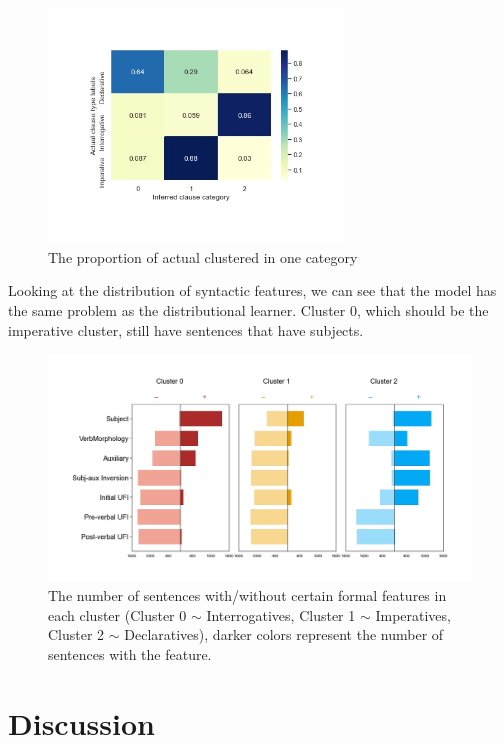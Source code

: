 \begin{figure}[H]
    \centering
    \includegraphics[width=0.7\textwidth]{figures/noisy100-heatrev.jpg}
    \caption{The proportion of actual \diis{} clustered in one category}
    \label{fig:noisy100-heatrev}
\end{figure}

Looking at the distribution of syntactic features, we can see that the model has the same problem as the distributional learner. Cluster $0$, which should be the imperative cluster, still have sentences that have subjects. 

\begin{figure}[H]
    \centering
    \includegraphics[width=1\textwidth]{figures/noisy100-syncluster.jpg}
    \caption{The number of sentences with/without certain formal features in each cluster (Cluster 0 $\sim$ Interrogatives, Cluster 1 $\sim$ Imperatives, Cluster 2 $\sim$ Declaratives), darker colors represent the number of sentences with the feature.}
    \label{fig:noisy100-syncluster}
\end{figure}


\section{Discussion}
\label{sec:engcl:discussion}

